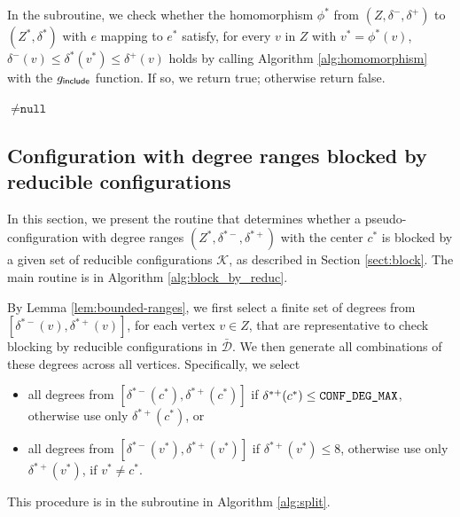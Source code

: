 \documentclass[main.tex]{subfiles}
\begin{document}
In the \rootedContainConf subroutine,
we check whether the homomorphism $\phi^*$ from $(Z, \delta^-, \delta^+)$ to $(Z^*, \delta^*)$ with $e$ mapping to $e^*$ satisfy, for every $v$ in $Z$ with $v^*=\phi^*(v)$, $\delta^-(v) \leq \delta^*(v^*) \leq \delta^+(v)$ holds by calling Algorithm \ref{alg:homomorphism} with the $g_\textsf{include}$ function.
If so, we return true; otherwise return false.

\begin{algorithm}[H]
    \caption{\rootedContainConfWithLink($(Z^*, \delta^*)$ $e^*$, $(Z, \delta^-, \delta^+)$, $e$)}
    \label{alg:rooted_contain_conf}
    \begin{algorithmic}[1]
        \State \Return {} $\neq \texttt{null}$
    \end{algorithmic}
\end{algorithm}

\subsection{Configuration with degree ranges blocked by reducible configurations}
\label{code:blocking-by-reduc}

In this section, we present the routine that determines whether a pseudo-configuration with degree ranges $(Z^*, \delta^{*-}, \delta^{*+})$ with the center $c^*$ is blocked by a given set of reducible configurations $\mathcal{K}$, as described in Section \ref{sect:block}.
The main routine is \blockByReducibleConfiguration in Algorithm \ref{alg:block_by_reduc}.

By Lemma \ref{lem:bounded-ranges}, we first select a finite set of degrees from $[\delta^{*-}(v), \delta^{*+}(v)]$, for each vertex $v \in Z$, that are representative to check blocking by reducible configurations in $\bar{\mathcal{D}}$.
We then generate all combinations of these degrees across all vertices.
Specifically, we select 
\begin{itemize}
    \item all degrees from $[\delta^{*-}(c^*), \delta^{*+}(c^*)]$ if $\delta^{*+}(c^*) \leq \texttt{CONF\_DEG\_MAX}$, otherwise use only $\delta^{*+}(c^*)$, or
    \item all degrees from $[\delta^{*-}(v^*), \delta^{*+}(v^*)]$ if $\delta^{*+}(v^*) \leq 8$, otherwise use only $\delta^{*+}(v^*)$, if $v^* \neq c^*$.
\end{itemize}
This procedure is in the \representativeDegree subroutine in Algorithm \ref{alg:split}.
\end{document}
